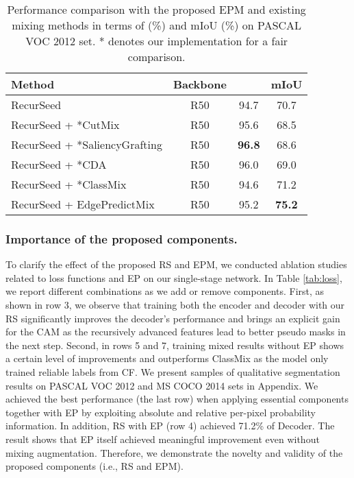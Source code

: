 \documentclass[11pt]{article}
\begin{document}
\begin{table}
\caption{
    Performance comparison with the proposed EPM and existing mixing methods in terms of  (\%) and mIoU (\%) on PASCAL VOC 2012  set. * denotes our implementation for a fair comparison.
  } 
  \centering
  \begin{scriptsize} 
  \begin{tabular}{p{} c c c}
    \toprule
    Method & Backbone &  & mIoU \\
    \hline \hline
RecurSeed & R50 & 94.7 & 70.7 \\
    RecurSeed + *CutMix \cite{yun2019cutmix} & R50 & 95.6 & 68.5 \\
    RecurSeed + *SaliencyGrafting \cite{park2021saliency} & R50 & \textbf{96.8} & 68.6 \\
    RecurSeed + *CDA \cite{su2021context} & R50 & 96.0 & 69.0 \\
    RecurSeed + *ClassMix \cite{olsson2021classmix} & R50 & 94.6 & 71.2 \\
RecurSeed + EdgePredictMix & R50 & 95.2 & \textbf{75.2} \\
    \bottomrule
  \end{tabular}
  \label{tab:mix}
  \end{scriptsize}
    \vspace{-3mm}

\end{table}
 
\subsubsection{Importance of the proposed components.}  
To clarify the effect of the proposed RS and EPM, we conducted ablation studies related to loss functions and EP on our single-stage network. In Table \ref{tab:loss}, we report different combinations as we add or remove components. First, as shown in row 3, we observe that training both the encoder and decoder with our RS significantly improves the decoder's performance and brings an explicit gain for the CAM as the recursively advanced features lead to better pseudo masks in the next step.    
Second, in rows 5 and 7, training mixed results without EP shows a certain level of improvements and outperforms ClassMix \cite{olsson2021classmix} as the model only trained reliable labels from CF. {We present samples of qualitative segmentation results on PASCAL VOC 2012 and MS COCO 2014 sets in Appendix.} {We achieved the best performance (the last row) when applying essential components together with EP by exploiting absolute and relative per-pixel probability information.} {In addition, RS with EP (row 4) achieved 71.2\% of Decoder. The result shows that EP itself achieved meaningful improvement even without mixing augmentation.} Therefore, we demonstrate the novelty and validity of the proposed components (i.e., RS and EPM).
\end{document}
